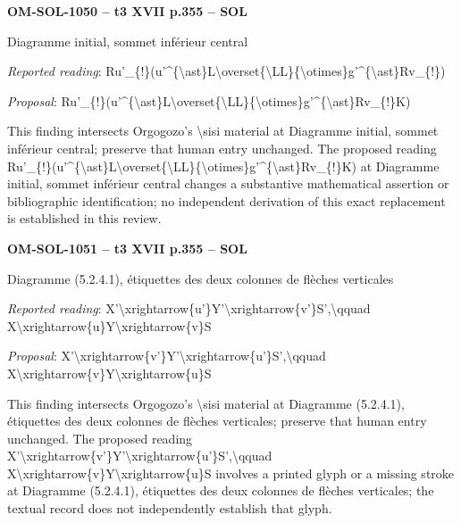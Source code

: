 \par\noindent\textbf{OM-SOL-1050 -- t3 XVII p.355 -- SOL}\par
Diagramme initial, sommet inférieur central\par
\emph{Reported reading}: Ru'\_\{!\}(u'\textasciicircum{}\{\textbackslash{}ast\}L\textbackslash{}overset\{\textbackslash{}LL\}\{\textbackslash{}otimes\}g'\textasciicircum{}\{\textbackslash{}ast\}Rv\_\{!\})\par
\emph{Proposal}: Ru'\_\{!\}(u'\textasciicircum{}\{\textbackslash{}ast\}L\textbackslash{}overset\{\textbackslash{}LL\}\{\textbackslash{}otimes\}g'\textasciicircum{}\{\textbackslash{}ast\}Rv\_\{!\}K)\par
This finding intersects Orgogozo's \textbackslash{}sisi material at Diagramme initial, sommet inférieur central; preserve that human entry unchanged. The proposed reading Ru'\_\{!\}(u'\textasciicircum{}\{\textbackslash{}ast\}L\textbackslash{}overset\{\textbackslash{}LL\}\{\textbackslash{}otimes\}g'\textasciicircum{}\{\textbackslash{}ast\}Rv\_\{!\}K) at Diagramme initial, sommet inférieur central changes a substantive mathematical assertion or bibliographic identification; no independent derivation of this exact replacement is established in this review.\par
\par\noindent\textbf{OM-SOL-1051 -- t3 XVII p.355 -- SOL}\par
Diagramme (5.2.4.1), étiquettes des deux colonnes de flèches verticales\par
\emph{Reported reading}: X'\textbackslash{}xrightarrow\{u'\}Y'\textbackslash{}xrightarrow\{v'\}S',\textbackslash{}qquad X\textbackslash{}xrightarrow\{u\}Y\textbackslash{}xrightarrow\{v\}S\par
\emph{Proposal}: X'\textbackslash{}xrightarrow\{v'\}Y'\textbackslash{}xrightarrow\{u'\}S',\textbackslash{}qquad X\textbackslash{}xrightarrow\{v\}Y\textbackslash{}xrightarrow\{u\}S\par
This finding intersects Orgogozo's \textbackslash{}sisi material at Diagramme (5.2.4.1), étiquettes des deux colonnes de flèches verticales; preserve that human entry unchanged. The proposed reading X'\textbackslash{}xrightarrow\{v'\}Y'\textbackslash{}xrightarrow\{u'\}S',\textbackslash{}qquad X\textbackslash{}xrightarrow\{v\}Y\textbackslash{}xrightarrow\{u\}S involves a printed glyph or a missing stroke at Diagramme (5.2.4.1), étiquettes des deux colonnes de flèches verticales; the textual record does not independently establish that glyph.\par
